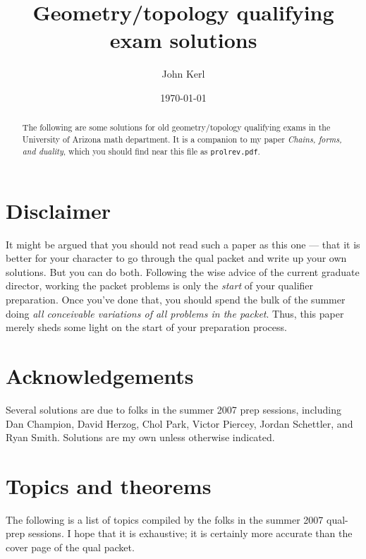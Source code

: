 \documentclass[10pt]{article}
\numberwithin{equation}{subsection}
\begin{document}
\title{Geometry/topology qualifying exam solutions}
\author{John Kerl}
\date{\today}

\maketitle
\begin{abstract}
The following are some solutions for old geometry/topology qualifying exams in
the University of Arizona math department.  It is a companion to my paper
\emph{Chains, forms, and duality}, which you should find near this file as
\texttt{prolrev.pdf}.
\end{abstract}

\tableofcontents

\newpage
\section{Disclaimer}

It might be argued that you should not read such a paper as this one --- that
it is better for your character to go through the qual packet and write up your
own solutions.  But you can do both.  Following the wise advice of the current
graduate director, working the packet problems is only the \emph{start} of your
qualifier preparation.  Once you've done that, you should spend the bulk of the
summer doing \emph{all conceivable variations of all problems in the packet}.
Thus, this paper merely sheds some light on the start of your preparation
process.

\section{Acknowledgements}

Several solutions are due to folks in the summer 2007 prep sessions, including
Dan Champion, David Herzog, Chol Park, Victor Piercey, Jordan Schettler, and
Ryan Smith.  Solutions are my own unless otherwise indicated.

\section{Topics and theorems}

The following is a list of topics compiled by the folks in the summer 2007
qual-prep sessions.  I hope that it is exhaustive; it is certainly more
accurate than the cover page of the qual packet.
\end{document}
